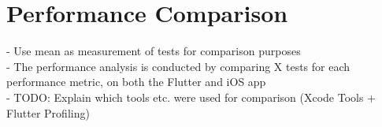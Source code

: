 \chapter{Performance Comparison}

- Use mean as measurement of tests for comparison purposes\\
- The performance analysis is conducted by comparing X tests for each performance metric, on both the Flutter and iOS app\\
- TODO: Explain which tools etc. were used for comparison (Xcode Tools + Flutter Profiling)\\